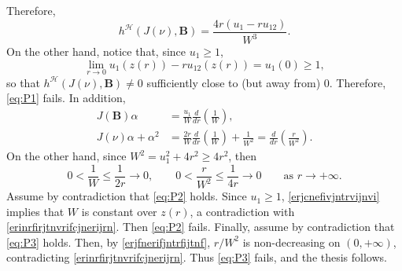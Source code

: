 \documentclass[11pt]{amsart}
\renewcommand{\geq}{\geqslant}
\newcommand{\hhh}{{\mathcal{H}}}
\theoremstyle{definition}
\theoremstyle{remark}
\numberwithin{equation}{section}
\begin{document}
Therefore,
\begin{equation*}
     h^{\hhh}(J(\nu),\mathbf B)
   =\frac{4r(u_1-ru_{12})}{W^3}.
\end{equation*}
On the other hand, notice that, since $u_1\geq 1$, 
\[
   \lim_{r\to 0} u_1(z(r))-ru_{12}(z(r))= u_1(0)\geqslant1, 
\]
so that $ h^{\hhh}(J(\nu),\mathbf B)\neq 0$ 
sufficiently close to (but away from) $0$. Therefore, \eqref{eq:P1} fails.
In addition,
\begin{align}
    J(\mathbf B)\alpha
    &=\frac{u_1}{W}\frac{d}{dr}\left(\frac1W\right),\label{erjcnefivjntrvijnvi}\\
    J(\nu)\alpha+\alpha^2
    &=\frac{2r}{W}\frac{d}{dr}\left(\frac1W\right)+\frac1{W^2}
      =\frac{d}{dr}\left(\frac{r}{W^2}\right)\label{erjfnerifjntrfijtnf}.
\end{align}
On the other hand, since $W^2=u_1^2+4r^2\geqslant4r^2$, then
\begin{equation}\label{erinrfirjtnvrifcjnerijrn}
    0<\frac1W\leqslant\frac1{2r}\longrightarrow0,
    \qquad
    0<\frac{r}{W^2}\leqslant\frac1{4r}\longrightarrow0
    \qquad\text{as }r\to+\infty.
\end{equation}
Assume by contradiction that \eqref{eq:P2} holds. Since $u_1\geq 1$, \eqref{erjcnefivjntrvijnvi} implies that $W$ is constant over $z(r)$, a contradiction with \eqref{erinrfirjtnvrifcjnerijrn}. Then \eqref{eq:P2} fails. Finally, assume by contradiction that \eqref{eq:P3} holds. Then, by \eqref{erjfnerifjntrfijtnf}, $r/W^2$ is
non-decreasing on $(0,+\infty)$, contradicting \eqref{erinrfirjtnvrifcjnerijrn}. Thus \eqref{eq:P3} fails, and the thesis follows.
\end{document}
